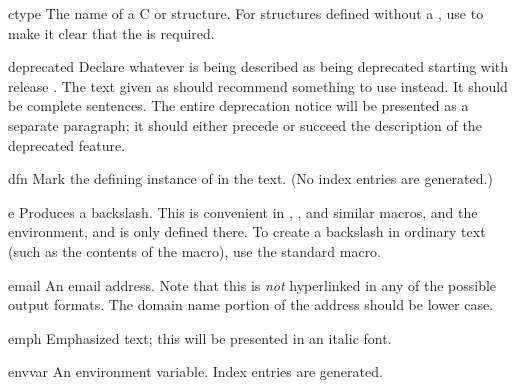 \documentclass{howto}
\begin{document}
    \begin{macrodesc}{ctype}{}
      The name of a C  or structure.  For structures
      defined without a , use  to make it clear that the  is
      required.
    \end{macrodesc}

    \begin{macrodesc}{deprecated}{}
      Declare whatever is being described as being deprecated starting
      with release .  The text given as 
      should recommend something to use instead.  It should be
      complete sentences.  The entire deprecation notice will be
      presented as a separate paragraph; it should either precede or
      succeed the description of the deprecated feature.
    \end{macrodesc}

    \begin{macrodesc}{dfn}{}
      Mark the defining instance of  in the text.  (No index
      entries are generated.)
    \end{macrodesc}

    \begin{macrodesc}{e}{}
      Produces a backslash.  This is convenient in ,
      , and similar macros, and the 
      environment, and is only defined there.  To
      create a backslash in ordinary text (such as the contents of the
       macro), use the standard 
      macro.
    \end{macrodesc}

    \begin{macrodesc}{email}{}
      An email address.  Note that this is \emph{not} hyperlinked in
      any of the possible output formats.  The domain name portion of
      the address should be lower case.
    \end{macrodesc}

    \begin{macrodesc}{emph}{}
      Emphasized text; this will be presented in an italic font.
    \end{macrodesc}

    \begin{macrodesc}{envvar}{}
      An environment variable.  Index entries are generated.
    \end{macrodesc}
\end{document}
